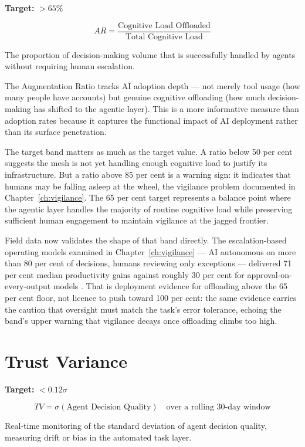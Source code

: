 \begin{definitionbox}[title={Augmentation Ratio (AR)}]
\textbf{Target:} $> 65\%$

\[
AR = \frac{\text{Cognitive Load Offloaded}}{\text{Total Cognitive Load}}
\]

The proportion of decision-making volume that is successfully handled by agents without requiring human escalation.
\end{definitionbox}

The Augmentation Ratio tracks AI adoption depth --- not merely tool usage (how many people have accounts) but genuine cognitive offloading (how much decision-making has shifted to the agentic layer). This is a more informative measure than adoption rates because it captures the functional impact of AI deployment rather than its surface penetration.

The target band matters as much as the target value. A ratio below 50 per cent suggests the mesh is not yet handling enough cognitive load to justify its infrastructure. But a ratio above 85 per cent is a warning sign: it indicates that humans may be falling asleep at the wheel, the vigilance problem documented in Chapter~\ref{ch:vigilance}. The 65 per cent target represents a balance point where the agentic layer handles the majority of routine cognitive load while preserving sufficient human engagement to maintain vigilance at the jagged frontier.

Field data now validates the shape of that band directly. The escalation-based operating models examined in Chapter~\ref{ch:vigilance} --- AI autonomous on more than 80 per cent of decisions, humans reviewing only exceptions --- delivered 71 per cent median productivity gains against roughly 30 per cent for approval-on-every-output models \parencite{Pereira2026Playbook}. That is deployment evidence for offloading above the 65 per cent floor, not licence to push toward 100 per cent: the same evidence carries the caution that oversight must match the task's error tolerance, echoing the band's upper warning that vigilance decays once offloading climbs too high.

\section{Trust Variance}

\begin{definitionbox}[title={Trust Variance (TV)}]
\textbf{Target:} $< 0.12\sigma$

\[
TV = \sigma \left( \text{Agent Decision Quality} \right) \quad \text{over a rolling 30-day window}
\]

Real-time monitoring of the standard deviation of agent decision quality, measuring drift or bias in the automated task layer.
\end{definitionbox}

